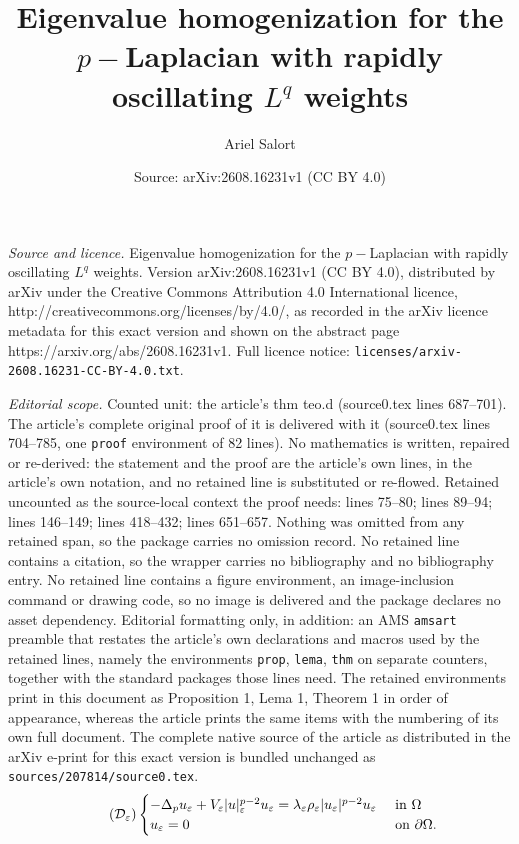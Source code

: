 \documentclass[10pt,a4paper]{amsart}
\title{Eigenvalue homogenization for the $p-$Laplacian with rapidly oscillating $L^q$ weights}
\author{Ariel Salort}
\date{Source: arXiv:2608.16231v1 (CC BY 4.0)}
\begin{document}
\maketitle

\noindent\emph{Source and licence.} Eigenvalue homogenization for the $p-$Laplacian with rapidly oscillating $L^q$ weights. Version arXiv:2608.16231v1 (CC BY 4.0), distributed by arXiv under the Creative Commons Attribution 4.0 International licence, http://creativecommons.org/licenses/by/4.0/, as recorded in the arXiv licence metadata for this exact version and shown on the abstract page https://arxiv.org/abs/2608.16231v1. Full licence notice: \texttt{licenses/arxiv-2608.16231-CC-BY-4.0.txt}.\par\smallskip

\noindent\textit{Editorial scope.} Counted unit: the article's thm teo.d (source0.tex lines 687--701). The article's complete original proof of it is delivered with it (source0.tex lines 704--785, one \texttt{proof} environment of 82 lines). No mathematics is written, repaired or re-derived: the statement and the proof are the article's own lines, in the article's own notation, and no retained line is substituted or re-flowed.  Retained uncounted as the source-local context the proof needs: lines 75--80; lines 89--94; lines 146--149; lines 418--432; lines 651--657.  Nothing was omitted from any retained span, so the package carries no omission record.  No retained line contains a citation, so the wrapper carries no bibliography and no bibliography entry.  No retained line contains a figure environment, an image-inclusion command or drawing code, so no image is delivered and the package declares no asset dependency.  Editorial formatting only, in addition: an AMS \texttt{amsart} preamble that restates the article's own declarations and macros used by the retained lines, namely the environments \texttt{prop}, \texttt{lema}, \texttt{thm} on separate counters, together with the standard packages those lines need.  The retained environments print in this document as Proposition 1, Lema 1, Theorem 1 in order of appearance, whereas the article prints the same items with the numbering of its own full document.  The complete native source of the article as distributed in the arXiv e-print for this exact version is bundled unchanged as \texttt{sources/207814/source0.tex}.
\begin{align}\tag{$\mathcal{D}_\varepsilon$}   \label{eq.p.eps} 
\begin{cases}
-\Delta_p u_\varepsilon + V_\varepsilon |u|_\varepsilon^{p-2} u_\varepsilon= \lambda_\varepsilon \rho_\varepsilon |u_\varepsilon|^{p-2}u_\varepsilon &\text{ in } \Omega\\
u_\varepsilon=0 & \text{ on } \partial\Omega.
\end{cases}
\end{align}
\end{document}
